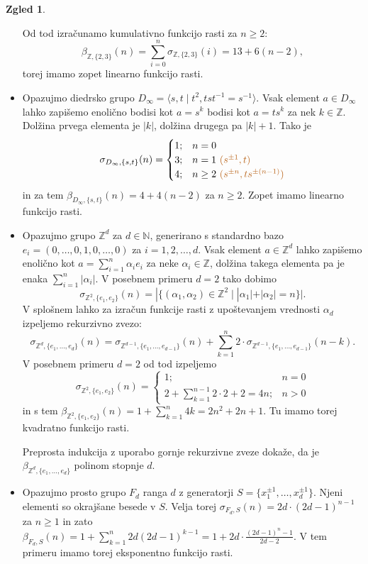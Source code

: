 \documentclass[11pt]{book}
\def\NN{\mathbb{N}}
\def\ZZ{\mathbb{Z}}
\def\vprasanje{\color{oranzna}}
\theoremstyle{definition}
\theoremstyle{zgled}
\newtheorem*{zgled}{Zgled}
\theoremstyle{odprtproblem}
\theoremstyle{domacanaloga}
\theoremstyle{izrek}
\begin{document}
\begin{zgled}
\begin{itemize}
    Od tod izračunamo kumulativno funkcijo rasti za $n \geq 2$:
    \[
    \beta_{\ZZ, \{2,3 \}}(n) = \sum_{i = 0}^n \sigma_{\ZZ, \{2,3 \}}(i) = 13 + 6(n-2),
    \]
    torej imamo zopet {\vprasanje linearno funkcijo rasti}.

    \item Opazujmo diedrsko grupo $D_\infty = \langle s, t \mid t^2, tst^{-1} = s^{-1} \rangle$. Vsak element $a \in D_\infty$ lahko zapišemo enolično bodisi kot $a = s^k$ bodisi kot $a = t s^k$ za nek $k \in \ZZ$. Dolžina prvega elementa je $|k|$, dolžina drugega pa $|k| + 1$. Tako je
    \[
    \sigma_{D_\infty, \{ s, t \}}(n) = \begin{cases}
    1; & n = 0 \\
    3; & n = 1 {\vprasanje \ (s^{\pm 1}, t)} \\
    4; & n \geq 2 {\vprasanje \ (s^{\pm n}, t s^{\pm (n-1)})} \\
    \end{cases}
    \]
    in za tem $\beta_{D_\infty, \{ s, t \}}(n) = 4 + 4(n-2)$ za $n \geq 2$. Zopet imamo {\vprasanje linearno funkcijo rasti}.

    \item Opazujmo grupo $\ZZ^d$ za $d \in \NN$, generirano s standardno bazo $e_i = (0,\dots,0,1,0,\dots,0)$ za $i = 1,2,\dots,d$. Vsak element $a \in \ZZ^d$ lahko zapišemo enolično kot $a = \sum_{i = 1}^n \alpha_i e_i$ za neke $\alpha_i \in \ZZ$, dolžina takega elementa pa je enaka $\sum_{i = 1}^n |\alpha_i|$. V posebnem primeru $d = 2$ tako dobimo
    \[
    \sigma_{\ZZ^2, \{ e_1, e_2 \}}(n) = |\{ (\alpha_1, \alpha_2) \in \ZZ^2 \mid |\alpha_1| + |\alpha_2| = n \}|.
    \]
    V splošnem lahko za izračun funkcije rasti z upoštevanjem vrednosti $\alpha_d$ izpeljemo rekurzivno zvezo:
    \[
    \sigma_{\ZZ^d, \{ e_1, \dots, e_d \}}(n) = \sigma_{\ZZ^{d-1}, \{ e_1, \dots, e_{d-1} \}}(n) + \sum_{k = 1}^n 2 \cdot \sigma_{\ZZ^{d-1}, \{ e_1, \dots, e_{d-1}\}}(n-k).
    \]
    V posebnem primeru $d = 2$ od tod izpeljemo
    \[
    \sigma_{\ZZ^2, \{ e_1, e_2\}}(n) = \begin{cases}
    1; & n = 0 \\
    2 + \sum_{k=1}^{n-1} 2 \cdot 2 + 2 = 4n; & n > 0
    \end{cases}
    \]
    in s tem $\beta_{\ZZ^2, \{ e_1, e_2 \}}(n) = 1 + \sum_{k = 1}^n 4k = 2n^2 + 2n + 1$. Tu imamo torej {\vprasanje kvadratno funkcijo rasti}.

    Preprosta indukcija z uporabo gornje rekurzivne zveze dokaže, da je $\beta_{\ZZ^d, \{ e_1, \dots, e_d \}}$ {\vprasanje polinom stopnje $d$}.

    \item Opazujmo prosto grupo $F_d$ ranga $d$ z generatorji $S = \{ x_1^{\pm 1}, \dots, x_d^{\pm 1} \}$. Njeni elementi so okrajšane besede v $S$. Velja torej $\sigma_{F_d, S}(n) = 2d \cdot (2d-1)^{n-1}$ za $n \geq 1$ in zato $\beta_{F_d, S}(n) = 1 + \sum_{k=1}^n 2d (2d-1)^{k-1} = 1 + 2d \cdot \frac{(2d-1)^n - 1}{2d - 2}$. V tem primeru imamo torej {\vprasanje eksponentno funkcijo rasti}.
\end{itemize}
\end{zgled}
\end{document}
